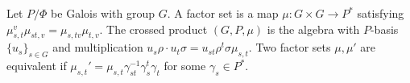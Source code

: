 Let $P/\Phi$ be Galois with group $G$. A factor set is a map $\mu: G \times G \to P^*$ satisfying $\mu_{s,t}^v \mu_{st,v} = \mu_{s,tv} \mu_{t,v}$. The crossed product $(G, P, \mu)$ is the algebra with $P$-basis $\{u_s\}_{s \in G}$ and multiplication $u_s \rho \cdot u_t \sigma = u_{st} \rho^t \sigma \mu_{s,t}$. Two factor sets $\mu, \mu'$ are equivalent if $\mu_{s,t}' = \mu_{s,t} \gamma_{st}^{-1} \gamma_s^t \gamma_t$ for some $\gamma_s \in P^*$.
